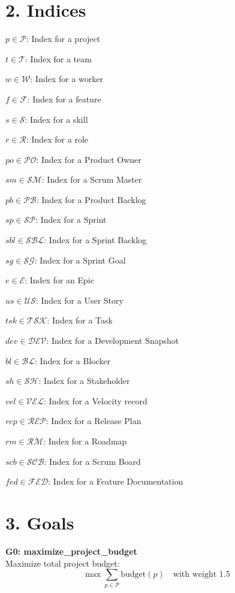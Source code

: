 \documentclass[12pt]{article}
\begin{document}
\section{2. Indices}
\item $ p \in \mathcal{P} $: Index for a project
    \item $ t \in \mathcal{T} $: Index for a team
    \item $ w \in \mathcal{W} $: Index for a worker
    \item $ f \in \mathcal{F} $: Index for a feature
    \item $ s \in \mathcal{S} $: Index for a skill
    \item $ r \in \mathcal{R} $: Index for a role
    \item $ po \in \mathcal{PO} $: Index for a Product Owner
    \item $ sm \in \mathcal{SM} $: Index for a Scrum Master
    \item $ pb \in \mathcal{PB} $: Index for a Product Backlog
    \item $ sp \in \mathcal{SP} $: Index for a Sprint
    \item $ sbl \in \mathcal{SBL} $: Index for a Sprint Backlog
    \item $ sg \in \mathcal{SG} $: Index for a Sprint Goal
    \item $ e \in \mathcal{E} $: Index for an Epic
    \item $ us \in \mathcal{US} $: Index for a User Story
    \item $ tsk \in \mathcal{TSK} $: Index for a Task
    \item $ dev \in \mathcal{DEV} $: Index for a Development Snapshot
    \item $ bl \in \mathcal{BL} $: Index for a Blocker
    \item $ sh \in \mathcal{SH} $: Index for a Stakeholder
    \item $ vel \in \mathcal{VEL} $: Index for a Velocity record
    \item $ rep \in \mathcal{REP} $: Index for a Release Plan
    \item $ rm \in \mathcal{RM} $: Index for a Roadmap
    \item $ scb \in \mathcal{SCB} $: Index for a Scrum Board
    \item $ fed \in \mathcal{FED} $: Index for a Feature Documentation

\section{3. Goals}
\item \textbf{G0: maximize\_project\_budget} \\
    Maximize total project budget: 
    \[
    \max \sum_{p \in \mathcal{P}} \text{budget}(p) \quad \text{with weight } 1.5
    \]
\end{document}
